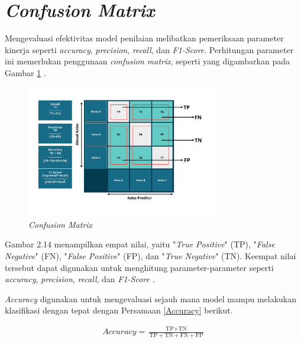     

\section{\textit{Confusion Matrix}}

    Mengevaluasi efektivitas model penilaian melibatkan pemeriksaan parameter kinerja seperti \textit{accuracy}, \textit{precision}, \textit{recall}, dan \textit{F1-Score}. Perhitungan parameter ini memerlukan penggunaan \textit{confusion matrix}, seperti yang digambarkan pada Gambar \ref{Confusion Matrix} \cite{Nurhikmat2018}.

    \begin{figure}[H]
      \centering
      \includegraphics[width=0.75\textwidth]{figures/bab2/confusion matriks.png}
      \caption{\textit{Confusion Matrix}}
      \label{Confusion Matrix}
    
    \end{figure}

    Gambar 2.14 menampilkan empat nilai, yaitu "\textit{True Positive}" (TP), "\textit{False Negative}" (FN), "\textit{False Positive}" (FP), dan "\textit{True Negative}" (TN). Keempat nilai tersebut dapat digunakan untuk menghitung parameter-parameter seperti \textit{accuracy}, \textit{precision}, \textit{recall}, dan \textit{F1-Score} \cite{Nurhikmat2018}.

     \textit{Accuracy} digunakan untuk mengevaluasi sejauh mana model mampu melakukan klasifikasi dengan tepat dengan Persamaan \ref{Accuracy} berikut. 
     
    \begin{equation}
        \begin{aligned}
            \textit{Accuracy} = \frac{\text{TP} + \text{TN}}{\text{TP} + \text{TN} + \text{FN} + \text{FP}}
        \end{aligned}\label{Accuracy}
    \end{equation}


